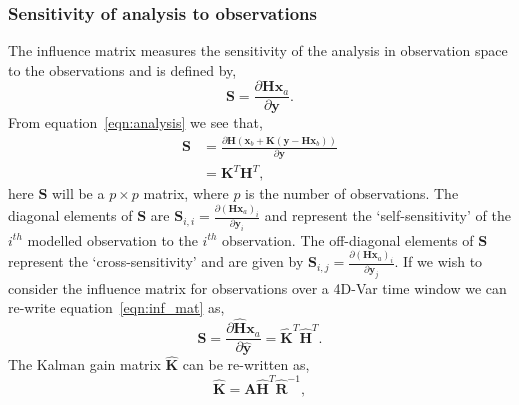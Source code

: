 \documentclass[11pt]{article}
\begin{document}


\subsubsection{Sensitivity of analysis to observations} \label{sec:inf_mat}

The influence matrix measures the sensitivity of the analysis in observation space to the observations \citep{Cardinali2004} and is defined by,
\begin{equation}
\textbf{S} = \frac{\partial \textbf{H}\textbf{x}_{a}}{\partial \textbf{y}}. \label{eqn:inf_mat}
\end{equation}
From equation~\eqref{eqn:analysis} we see that,
\begin{equation}
\begin{split}
\textbf{S} &= \frac{\partial \textbf{H}(\textbf{x}_{b} + \textbf{K}(\textbf{y} - \textbf{H}\textbf{x}_{b}))}{\partial \textbf{y}} \\
	       &= \textbf{K}^{T}\textbf{H}^{T},
\end{split}
\end{equation}
here $\textbf{S}$ will be a $p \times p$ matrix, where $p$ is the number of observations. The diagonal elements of $\textbf{S}$ are $\textbf{S}_{i,i} = \frac{\partial (\textbf{H}\textbf{x}_{a})_{i}}{\partial \textbf{y}_{i}}$ and represent the `self-sensitivity' of the $i^{th}$ modelled observation to the $i^{th}$ observation. The off-diagonal elements of $\textbf{S}$ represent the `cross-sensitivity' and are given by $\textbf{S}_{i,j} = \frac{\partial (\textbf{H}\textbf{x}_{a})_{i}}{\partial \textbf{y}_{j}}$. If we wish to consider the influence matrix for observations over a 4D-Var time window we can re-write equation~\eqref{eqn:inf_mat} as,
\begin{equation}
\textbf{S} = \frac{\partial \hat{\textbf{H}}\textbf{x}_{a}}{\partial \hat{\textbf{y}}} = \hat{\textbf{K}}^{T}\hat{\textbf{H}}^{T}. \label{eqn:4dinf_mat}
\end{equation}
The Kalman gain matrix $\hat{\textbf{K}}$ can be re-written as,
\begin{equation}
\hat{\textbf{K}} = \textbf{A}\hat{\textbf{H}}^{T}\hat{\textbf{R}}^{-1}, \label{eqn:analysis_kgain}
\end{equation}
\end{document}
